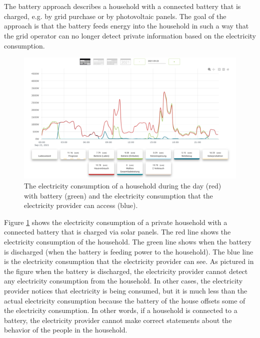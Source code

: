 \\
\\
The battery approach describes a household with a connected battery that is charged, e.g. by grid purchase or by photovoltaic panels. The goal of the approach is that the battery feeds energy into the household in such a way that the grid operator can no longer detect private information based on the electricity consumption. \\
\begin{figure}[tbp]
  \centering
  \includegraphics[width=1\textwidth]{images/Battery4.png}
  \caption[Battery Consumption Figure]{The electricity consumption of a household during the day (red) with battery (green) and the electricity consumption that the electricity provider can access (blue).}
  \label{fig:Battery}
\end{figure} Figure \ref{fig:Battery} shows the electricity consumption of a private household with a connected battery that is charged via solar panels. The red line shows the electricity consumption of the household. The green line shows when the battery is discharged (when the battery is feeding power to the household). The blue line is the electricity consumption that the electricity provider can see. As pictured in the figure when the battery is discharged, the electricity provider cannot detect any electricity consumption from the household. In other cases, the electricity provider notices that electricity is being consumed, but it is much less than the actual electricity consumption because the battery of the house offsets some of the electricity consumption. In other words, if a household is connected to a battery, the electricity provider cannot make correct statements about the behavior of the people in the household. \\
